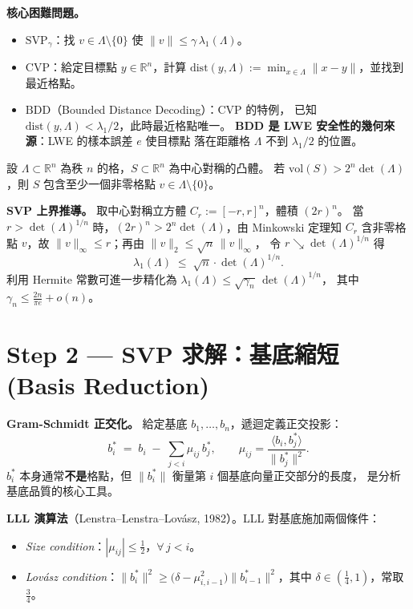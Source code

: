 \documentclass[12pt, a4paper]{article}
\begin{document}
\textbf{核心困難問題。}
\begin{itemize}\setlength{\itemsep}{2pt}
  \item $\mathrm{SVP}_\gamma$：找 $v\in\Lambda\setminus\{0\}$ 使 $\|v\|\leq\gamma\,\lambda_1(\Lambda)$。
  \item $\mathrm{CVP}$：給定目標點 $y\in\mathbb{R}^n$，計算
    $\mathrm{dist}(y,\Lambda):=\min_{x\in\Lambda}\|x-y\|$，並找到最近格點。
  \item $\mathrm{BDD}$（Bounded Distance Decoding）：CVP 的特例，
    已知 $\mathrm{dist}(y,\Lambda)<\lambda_1/2$，此時最近格點唯一。
    \textbf{BDD 是 LWE 安全性的幾何來源}：LWE 的樣本誤差 $e$ 使目標點
    落在距離格 $\Lambda$ 不到 $\lambda_1/2$ 的位置。
\end{itemize}

\begin{tcolorbox}[
  colback=notebg, colframe=noteborder,
  title={\bfseries Minkowski 第一定理（完整陳述）},
  fonttitle=\small, breakable
]
設 $\Lambda\subset\mathbb{R}^n$ 為秩 $n$ 的格，$S\subset\mathbb{R}^n$ 為中心對稱的凸體。
若 $\mathrm{vol}(S)>2^n\det(\Lambda)$，則 $S$ 包含至少一個非零格點 $v\in\Lambda\setminus\{0\}$。
\end{tcolorbox}

\textbf{SVP 上界推導。} 取中心對稱立方體 $C_r:=[-r,r]^n$，體積 $(2r)^n$。
當 $r>\det(\Lambda)^{1/n}$ 時，$(2r)^n>2^n\det(\Lambda)$，由 Minkowski 定理知
$C_r$ 含非零格點 $v$，故 $\|v\|_\infty\leq r$；再由 $\|v\|_2\leq\sqrt{n}\,\|v\|_\infty$，
令 $r\searrow\det(\Lambda)^{1/n}$ 得
\[
  \lambda_1(\Lambda)\;\leq\;\sqrt{n}\cdot\det(\Lambda)^{1/n}.
\]
利用 Hermite 常數可進一步精化為 $\lambda_1(\Lambda)\leq\sqrt{\gamma_n}\,\det(\Lambda)^{1/n}$，
其中 $\gamma_n\leq\tfrac{2n}{\pi e}+o(n)$。

\section{Step 2 \;—\; SVP 求解：基底縮短 \small\normalfont\color{gray}(Basis Reduction)}

\textbf{Gram-Schmidt 正交化。}
給定基底 $b_1,\ldots,b_n$，遞迴定義正交投影：
\[
  b_i^* \;=\; b_i \;-\; \sum_{j<i}\mu_{ij}\,b_j^*,
  \qquad \mu_{ij} = \frac{\langle b_i, b_j^*\rangle}{\|b_j^*\|^2}.
\]
$b_i^*$ 本身通常\textbf{不是}格點，但 $\|b_i^*\|$ 衡量第 $i$ 個基底向量正交部分的長度，
是分析基底品質的核心工具。

\textbf{LLL 演算法}（Lenstra--Lenstra--Lovász, 1982）。LLL 對基底施加兩個條件：
\begin{itemize}\setlength{\itemsep}{1pt}
  \item \textit{Size condition}：$|\mu_{ij}|\leq\tfrac{1}{2}$，$\forall\, j<i$。
  \item \textit{Lovász condition}：$\|b_i^*\|^2\geq
    \bigl(\delta-\mu_{i,i-1}^2\bigr)\|b_{i-1}^*\|^2$，其中 $\delta\in(\tfrac{1}{4},1)$，常取 $\tfrac{3}{4}$。
\end{itemize}
\end{document}
